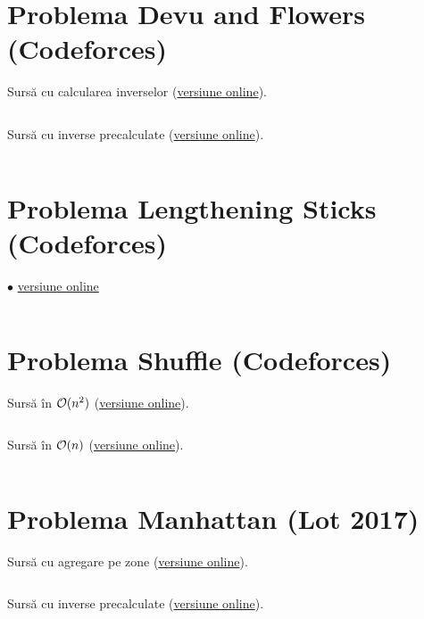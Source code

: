 \documentclass[../main.tex]{subfiles}
\begin{document}
\inputminted{cpp}{../src/math/monocarp-and-the-set.cpp}

\section{Problema Devu and Flowers (Codeforces)}
\label{code:devu-and-flowers}

Sursă cu calcularea inverselor (\href{https://codeforces.com/contest/451/submission/303384174}{versiune online}).

\inputminted{cpp}{../src/math/devu-and-flowers-1.cpp}

Sursă cu inverse precalculate (\href{https://codeforces.com/contest/451/submission/303384457}{versiune online}).

\inputminted{cpp}{../src/math/devu-and-flowers-2.cpp}

\section{Problema Lengthening Sticks (Codeforces)}
\label{code:lengthening-sticks}
$\bullet$
\href{https://codeforces.com/contest/571/submission/303241438}{versiune online}

\inputminted{cpp}{../src/math/lengthening-sticks.cpp}

\section{Problema Shuffle (Codeforces)}
\label{code:shuffle}

Sursă în $\mathcal{O}(n^2)$ (\href{https://codeforces.com/contest/1622/submission/240957706}{versiune online}).

\inputminted{cpp}{../src/math/shuffle-1.cpp}

Sursă în $\mathcal{O}(n)$ (\href{https://codeforces.com/contest/1622/submission/240964406}{versiune online}).

\inputminted{cpp}{../src/math/shuffle-2.cpp}

\section{Problema Manhattan (Lot 2017)}
\label{code:manhattan}

Sursă cu agregare pe zone (\href{https://kilonova.ro/submissions/1024133}{versiune online}).

\inputminted{cpp}{../src/math/manhattan-1.cpp}

Sursă cu inverse precalculate (\href{https://kilonova.ro/submissions/1024134}{versiune online}).

\inputminted{cpp}{../src/math/manhattan-2.cpp}
\end{document}
